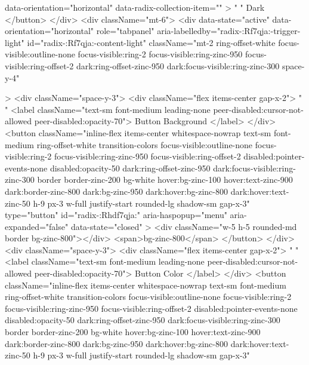 {                  data-orientation="horizontal"
                  data-radix-collection-item=""
                >
                  {" "}
                  Dark
                </button>
              </div>
              <div className="mt-6">
                <div
                  data-state="active"
                  data-orientation="horizontal"
                  role="tabpanel"
                  aria-labelledby="radix-:Rf7qja:-trigger-light"
                  id="radix-:Rf7qja:-content-light"
                  className="mt-2 ring-offset-white focus-visible:outline-none focus-visible:ring-2 focus-visible:ring-zinc-950 focus-visible:ring-offset-2 dark:ring-offset-zinc-950 dark:focus-visible:ring-zinc-300 space-y-4"
                  
                >
                  <div className="space-y-3">
                    <div className="flex items-center gap-x-2">
                      {" "}
                      <label className="text-sm font-medium leading-none peer-disabled:cursor-not-allowed peer-disabled:opacity-70">
                        Button Background
                      </label>
                    </div>
                    <button
                      className="inline-flex items-center whitespace-nowrap text-sm font-medium ring-offset-white transition-colors focus-visible:outline-none focus-visible:ring-2 focus-visible:ring-zinc-950 focus-visible:ring-offset-2 disabled:pointer-events-none disabled:opacity-50 dark:ring-offset-zinc-950 dark:focus-visible:ring-zinc-300 border border-zinc-200 bg-white hover:bg-zinc-100 hover:text-zinc-900 dark:border-zinc-800 dark:bg-zinc-950 dark:hover:bg-zinc-800 dark:hover:text-zinc-50 h-9 px-3 w-full justify-start rounded-lg shadow-sm gap-x-3"
                      type="button"
                      id="radix-:Rhdf7qja:"
                      aria-haspopup="menu"
                      aria-expanded="false"
                      data-state="closed"
                    >
                      <div className="w-5 h-5 rounded-md border bg-zinc-800"></div>
                      <span>bg-zinc-800</span>
                    </button>
                  </div>
                  <div className="space-y-3">
                    <div className="flex items-center gap-x-2">
                      {" "}
                      <label className="text-sm font-medium leading-none peer-disabled:cursor-not-allowed peer-disabled:opacity-70">
                        Button Color
                      </label>
                    </div>
                    <button
                      className="inline-flex items-center whitespace-nowrap text-sm font-medium ring-offset-white transition-colors focus-visible:outline-none focus-visible:ring-2 focus-visible:ring-zinc-950 focus-visible:ring-offset-2 disabled:pointer-events-none disabled:opacity-50 dark:ring-offset-zinc-950 dark:focus-visible:ring-zinc-300 border border-zinc-200 bg-white hover:bg-zinc-100 hover:text-zinc-900 dark:border-zinc-800 dark:bg-zinc-950 dark:hover:bg-zinc-800 dark:hover:text-zinc-50 h-9 px-3 w-full justify-start rounded-lg shadow-sm gap-x-3"
}
